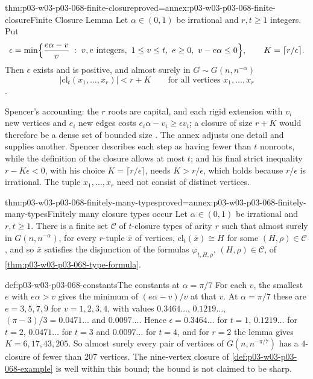 \begin{hbtheorem}{thm:p03-w03-p03-068-finite-closure}{proved=annex:p03-w03-p03-068-finite-closure}{Finite Closure Lemma}
Let \(\alpha\in(0,1)\) be irrational and \(r,t\geq1\) integers.  Put
\[
  \epsilon=\min\Bigl\{\frac{e\alpha-v}{v}\;:\;v,e\text{ integers},\ 1\leq v\leq t,
  \ e\geq0,\ v-e\alpha\leq0\Bigr\},
  \qquad K=\lceil r/\epsilon\rceil .
\]
Then \(\epsilon\) exists and is positive, and almost surely in
\(G\sim G(n,n^{-\alpha})\)
\[
  |\mathrm{cl}_t(x_1,\ldots,x_r)|<r+K\qquad\text{for all vertices }x_1,\ldots,x_r
\]
\cite[p.~9]{Spencer2007LogicRandomStructuresAuthor}.
\end{hbtheorem}

Spencer's accounting: the \(r\) roots are capital, and each rigid extension
with \(v_i\) new vertices and \(e_i\) new edges costs \(e_i\alpha-v_i\geq
\epsilon v_i\); a closure of size \(r+K\) would therefore be a dense set of
bounded size \cite[p.~9]{Spencer2007LogicRandomStructuresAuthor}.  The annex adjusts one
detail and supplies another.  Spencer describes each step as having fewer
than \(t\) nonroots, while the definition of the closure allows at most
\(t\); and his final strict inequality \(r-K\epsilon<0\), with his choice
\(K=\lceil r/\epsilon\rceil\), needs \(K>r/\epsilon\), which holds because
\(r/\epsilon\) is irrational.  The
tuple \(x_1,\ldots,x_r\) need not consist of distinct vertices.

\begin{hbcorollary}{thm:p03-w03-p03-068-finitely-many-types}{proved=annex:p03-w03-p03-068-finitely-many-types}{Finitely many closure types occur}
Let \(\alpha\in(0,1)\) be irrational and \(r,t\geq1\).  There is a finite set
\(\mathcal C\) of \(t\)-closure types of arity \(r\) such that almost surely
in \(G(n,n^{-\alpha})\), for every \(r\)-tuple \(\bar x\) of vertices,
\(\mathrm{cl}_t(\bar x)\cong H\) for some \((H,\rho)\in\mathcal C\), and so
\(\bar x\) satisfies the disjunction of the formulas \(\varphi_{t,H,\rho}\),
\((H,\rho)\in\mathcal C\), of \cref{thm:p03-w03-p03-068-type-formula}.
\end{hbcorollary}

\begin{hbexample}{def:p03-w03-p03-068-constants}{The constants at \(\alpha=\pi/7\)}
For each \(v\), the smallest \(e\) with \(e\alpha>v\) gives the minimum of
\((e\alpha-v)/v\) at that \(v\).  At \(\alpha=\pi/7\) these are \(e=3,5,7,9\)
for \(v=1,2,3,4\), with values \(0.3464\ldots\), \(0.1219\ldots\),
\((\pi-3)/3=0.0471\ldots\) and \(0.0097\ldots\).  Hence
\(\epsilon=0.3464\ldots\) for \(t=1\), \(0.1219\ldots\) for \(t=2\),
\(0.0471\ldots\) for \(t=3\) and \(0.0097\ldots\) for \(t=4\), and for \(r=2\)
the lemma gives \(K=6,17,43,205\).  So almost surely every pair of vertices
of \(G(n,n^{-\pi/7})\) has a \(4\)-closure of fewer than \(207\) vertices.
The nine-vertex closure of \cref{def:p03-w03-p03-068-example} is well
within this bound; the bound is not claimed to be sharp.
\end{hbexample}

